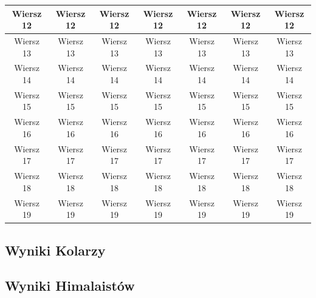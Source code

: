 \begin{table}[ht]
\begin{tabular}{|c|c|c|c|c|c|c|}
    \hline
    Wiersz 12 & Wiersz 12 & Wiersz 12 & Wiersz 12 & Wiersz 12 & Wiersz 12 & Wiersz 12 \\
    \hline
    Wiersz 13 & Wiersz 13 & Wiersz 13 & Wiersz 13 & Wiersz 13 & Wiersz 13 & Wiersz 13 \\
    \hline
    Wiersz 14 & Wiersz 14 & Wiersz 14 & Wiersz 14 & Wiersz 14 & Wiersz 14 & Wiersz 14 \\
    \hline
    Wiersz 15 & Wiersz 15 & Wiersz 15 & Wiersz 15 & Wiersz 15 & Wiersz 15 & Wiersz 15 \\
    \hline
    Wiersz 16 & Wiersz 16 & Wiersz 16 & Wiersz 16 & Wiersz 16 & Wiersz 16 & Wiersz 16 \\
    \hline
    Wiersz 17 & Wiersz 17 & Wiersz 17 & Wiersz 17 & Wiersz 17 & Wiersz 17 & Wiersz 17 \\
    \hline
    Wiersz 18 & Wiersz 18 & Wiersz 18 & Wiersz 18 & Wiersz 18 & Wiersz 18 & Wiersz 18 \\
    \hline
    Wiersz 19 & Wiersz 19 & Wiersz 19 & Wiersz 19 & Wiersz 19 & Wiersz 19 & Wiersz 19 \\
    \hline
    \end{tabular}
\end{table}
\subsection{Wyniki Kolarzy}
\subsection{Wyniki Himalaistów}